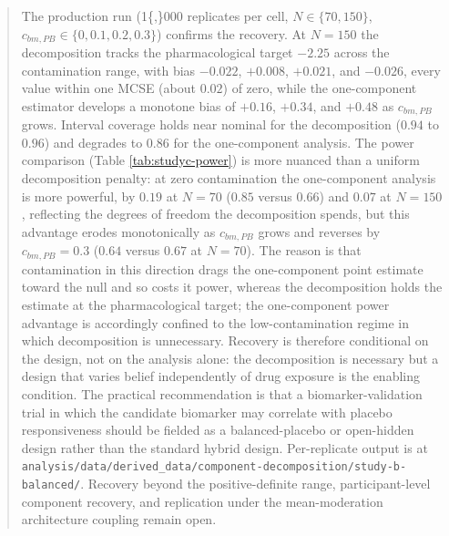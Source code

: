 \documentclass[
  11pt,
]{article}
\newenvironment{orig}{%
  \begin{quote}\normalsize\color[gray]{0.55}}{%
  \end{quote}}
\begin{document}
\begin{orig}
The production run (1\{,\}000 replicates per cell, \(N \in \{70, 150\}\),
\(c_{bm,PB} \in \{0, 0.1, 0.2, 0.3\}\)) confirms the recovery. At \(N=150\) the
decomposition tracks the pharmacological target \(-2.25\) across the
contamination range, with bias \(-0.022\), \(+0.008\), \(+0.021\), and \(-0.026\),
every value within one MCSE (about \(0.02\)) of zero,
while the one-component estimator develops a monotone bias of \(+0.16\),
\(+0.34\), and \(+0.48\) as \(c_{bm,PB}\) grows. Interval coverage holds near
nominal for the decomposition (\(0.94\) to \(0.96\)) and degrades to \(0.86\)
for the one-component analysis. The power comparison (Table
\ref{tab:studyc-power}) is more nuanced than a uniform decomposition
penalty: at zero contamination the one-component analysis is more
powerful, by \(0.19\) at \(N=70\) (\(0.85\) versus \(0.66\)) and \(0.07\) at
\(N=150\), reflecting the degrees of freedom the decomposition spends, but
this advantage erodes monotonically as \(c_{bm,PB}\) grows and reverses by
\(c_{bm,PB}=0.3\) (\(0.64\) versus \(0.67\) at \(N=70\)). The reason is that
contamination in this direction drags the one-component point estimate
toward the null and so costs it power, whereas the decomposition holds
the estimate at the pharmacological target; the one-component power
advantage is accordingly confined to the low-contamination regime in
which decomposition is unnecessary. Recovery is therefore conditional on the design, not on the
analysis alone: the decomposition is necessary but a design that varies
belief independently of drug exposure is the enabling condition. The
practical recommendation is that a biomarker-validation trial in which the
candidate biomarker may correlate with placebo responsiveness should be
fielded as a balanced-placebo or open-hidden design rather than the
standard hybrid design. Per-replicate output is at
\texttt{analysis/data/derived\_data/component-decomposition/study-b-balanced/}.
Recovery beyond the positive-definite range, participant-level component
recovery, and replication under the mean-moderation architecture coupling remain open.

\end{orig}
\end{document}
